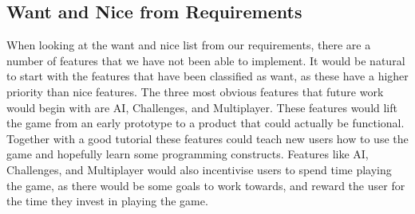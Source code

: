 \subsection{Want and Nice from Requirements}
When looking at the want and nice list from our requirements, there are a number of features that we have not been able to implement. It would be natural to start with the features that have been classified as want, as these have a higher priority than nice features. The three most obvious features that future work would begin with are AI, Challenges, and Multiplayer. These features would lift the game from an early prototype to a product that could actually be functional. Together with a good tutorial these features could teach new users how to use the game and hopefully learn some programming constructs. Features like AI, Challenges, and Multiplayer would also incentivise users to spend time playing the game, as there would be some goals to work towards, and reward the user for the time they invest in playing the game.


